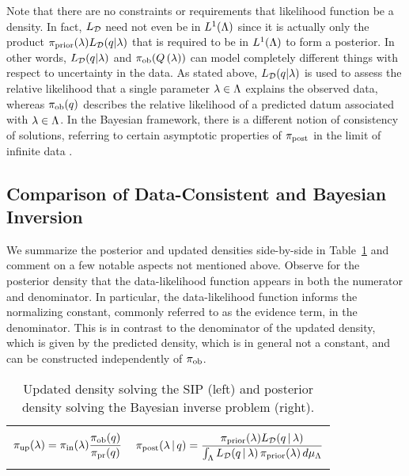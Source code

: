 Note that there are no constraints or requirements that likelihood function be a density.
In fact, $L_{\mathcal{D}}$ need not even be in $L^1({\Lambda})$ since it is actually only the product $\operatorname*{\pi_{prior}}(\lambda) L_{\mathcal{D}} (q | \lambda)$ that is required to be in $L^1({\Lambda})$ to form a posterior.
In other words, $L_{\mathcal{D}} (q | \lambda)$ and $\operatorname*{\pi_{ob}}(Q\left ( \lambda \right ))$ can model completely different things with respect to uncertainty in the data.
As stated above, $L_{\mathcal{D}} (q | \lambda)$ is used to assess the relative likelihood that a single parameter $\lambda\in{\Lambda}$ explains the observed data, whereas $\operatorname*{\pi_{ob}}(q)$ describes the relative likelihood of a predicted datum associated with $\lambda\in{\Lambda}$.
In the Bayesian framework, there is a different notion of consistency of solutions, referring to certain asymptotic properties of $\operatorname*{\pi_{post}}$ in the limit of infinite data \citep{Barron, Silverman, starktenorio}.




\subsection{Comparison of Data-Consistent and Bayesian Inversion}\label{sec:bayesian}

We summarize the posterior and updated densities side-by-side in Table~\ref{tab:dens_comparisons} and comment on a few notable aspects not mentioned above.
Observe for the posterior density that the data-likelihood function appears in both the numerator and denominator.
In particular, the data-likelihood function informs the {normalizing constant}, commonly referred to as the evidence term, in the denominator.
This is in contrast to the denominator of the updated density, which is given by the predicted density, which is in general not a constant, and can be constructed independently of $\operatorname*{\pi_{ob}}$.

\begin{table}[htbp]
\centering
\begin{tabular}{|c|c|}
\hline
 & \\
$\displaystyle \operatorname*{\pi_{up}}(\lambda) = \operatorname*{\pi_{in}}(\lambda) \frac{\operatorname*{\pi_{ob}}(q)}{\operatorname*{\pi_{pr}}(q)}
$
&
$
	\displaystyle \pi_{\text{post}}(\lambda\,|\,q) = \frac{\operatorname*{\pi_{prior}}(\lambda)L_{\mathcal{D}}(q \,|\,\lambda)}{\int_{\Lambda} L_{\mathcal{D}}(q \, |\, \lambda)  \operatorname*{\pi_{prior}}(\lambda) \, d\mu_{{\Lambda}}}
$
 \\ & \\ \hline
\end{tabular}
\caption{Updated density solving the SIP (left) and posterior density solving the Bayesian inverse problem (right).}
		\label{tab:dens_comparisons}
\end{table}

